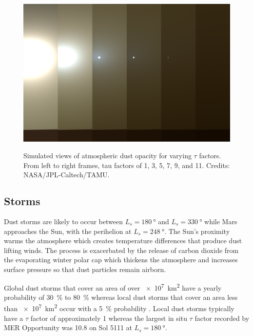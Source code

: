 \begin{figure}[H]
  \centering
  \hypersetup{linkcolor=captionTextColor}
  \includegraphics[width=0.8\linewidth]{sections/martian-environment/images/tau-factors.png}\\
  \caption[Simulated views of atmospheric dust opacity for varying $\tau$ factors]
          {Simulated views of atmospheric dust opacity for varying $\tau$ factors. From left to right frames, tau factors of 1, 3, 5, 7, 9, and 11. Credits: NASA/JPL-Caltech/TAMU.}
  \label{fig:image:tau-factors}
\end{figure}

\subsection{Storms}
\label{sec:MartianEnvironment:Dust:Storms}

Dust storms are likely to occur between $L_{s} = \SI{180}{\degree}$ and $L_{s} = \SI{330}{\degree}$ while Mars approaches the Sun, with the perihelion at $L_{s} = \SI{248}{\degree}$. The Sun's proximity warms the atmosphere which creates temperature differences that produce dust lifting winds. The process is exacerbated by the release of carbon dioxide from the evaporating winter polar cap which thickens the atmosphere and increases surface pressure so that dust particles remain airborn.


Global dust storms that cover an area of over \SI{e7}{\kilo\meter\squared} have a yearly probability of \SI{30}{\percent} to \SI{80}{\percent} whereas local dust storms that cover an area less than \SI{e7}{\kilo\meter\squared} occur with a \SI{5}{\percent} probability . Local dust storms typically have a $\tau$ factor of approximately 1  whereas the largest in situ $\tau$ factor recorded by \ac{MER} Opportunity was 10.8 on Sol 5111 at $L_{s} = \SI{180}{\degree}$.


